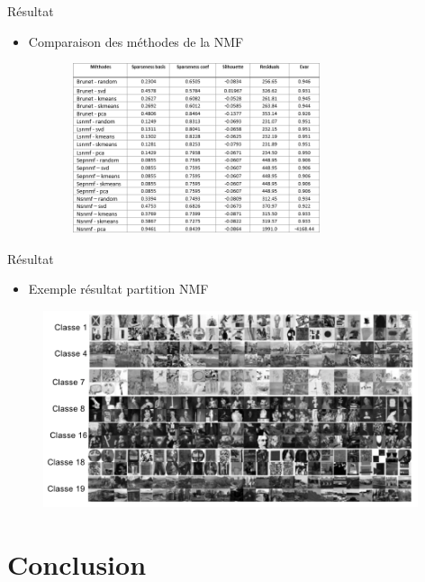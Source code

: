 \documentclass{beamer}
\begin{document}
\begin{frame}{Résultat}

\begin{itemize}
  \item Comparaison des méthodes de la NMF
\end{itemize}
\begin{figure}
\includegraphics[width=9cm ,height= 5cm]{tab-resultat.png}
\end{figure}

\end{frame}




\begin{frame}{Résultat}

\begin{itemize}
  \item Exemple résultat partition NMF
\end{itemize}
\begin{figure}
\includegraphics[width=11cm]{partition20.png}
\end{figure}

\end{frame}





\section{Conclusion}
\end{document}

